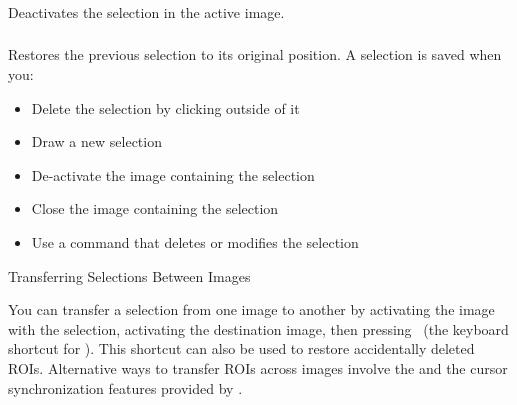 \subsubsection{\protect{}\label{sub:Select-None-[A]}}

Deactivates the selection in the active image. 


\subsubsection{\protect{}\label{sub:Restore-Selection-[E]}}

Restores the previous selection to its original position. A selection
is saved when you:
\begin{itemize}
\item Delete the selection by clicking outside of it
\item Draw a new selection
\item De-activate the image containing the selection
\item Close the image containing the selection
\item Use a command that deletes or modifies the selection
\end{itemize}


\begin{infobox}
\caption{\label{infobox:TransferSelections}Transferring Selections Between
Images}


\noindent You can transfer a selection from one image to another by
activating the image with the selection, activating the destination
image, then pressing \,
(the keyboard shortcut for ).
This shortcut can also be used to restore accidentally deleted ROIs.
Alternative ways to transfer ROIs across images involve the 
and the cursor synchronization features provided by .
\end{infobox}



\subsubsection[\protect\userinterface{Fit Spline}]{\protect{}\label{sub:Fit-Spline}\improvement{}}

